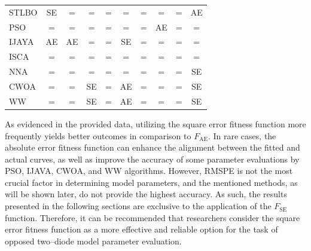 \documentclass[a4paper,fleqn]{cas-dc}
\begin{document}
\begin{table}[<options>]
\begin{tabular*}{\tblwidth}{@{}LCCCCCCCCC@{}}
STLBO &SE &=  &=  &=  &=  &=  &=  &=  & AE \\
PSO &=  &=  &=  &=  &=  &=  & AE &=  &=  \\
IJAYA & AE & AE & = &=  &SE & = & = &=  &=  \\
ISCA &=  &=  &=  &=  &=  &=  &=  &=  &=  \\
NNA &=  &=  &=  &=  &=  &=  &=  &=  & SE\\
CWOA &=  &=  & SE&=  &  AE&=  &=  &=  &SE \\
WW &=  &=  & SE& = & AE & = &=  &=  & SE\\
\bottomrule
\end{tabular*}
\end{table}

As evidenced in the provided data, utilizing the square error fitness function more frequently yields better outcomes in comparison to $F_\mathrm{AE}$.
In rare cases, the absolute error fitness function can enhance the alignment between the fitted and actual curves,
as well as improve the accuracy of some parameter evaluations by PSO, IJAVA, CWOA, and WW algorithms.
However, RMSPE is not the most crucial factor in determining model parameters, and the mentioned methods,
as will be shown later, do not provide the highest accuracy.
As such, the results presented in the following sections are exclusive to the application of the $F_\mathrm{SE}$ function.
Therefore, it can be recommended that researchers consider 
the square error fitness function as a more effective and reliable option for the task of opposed two--diode model parameter evaluation.
\end{document}
